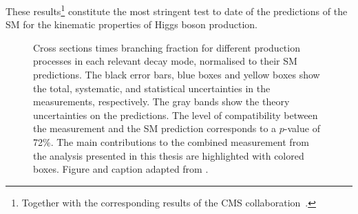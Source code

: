 These results\footnote{Together with the corresponding results of the CMS collaboration~\cite{CMSNaturePaper}.} constitute the most stringent test to date of the predictions of the SM for the kinematic properties of Higgs boson production.
\begin{figure}[b]
    \caption[Higgs boson cross sections times branching fraction for different production processes in each relevant decay mode.]{Cross sections times branching fraction for different production processes in each relevant decay mode, normalised to their SM predictions. The black error bars, blue boxes and yellow boxes show the total, systematic, and statistical uncertainties in the measurements, respectively. The gray bands show the theory uncertainties on the predictions. The level of compatibility between the measurement and the SM prediction corresponds to a $p$-value of 72\%. 
    The main contributions to the combined measurement from the \HWW analysis presented in this thesis are highlighted with colored boxes. 
    Figure and caption adapted from .}
    \label{fig:prod-per-channel}
\end{figure}

